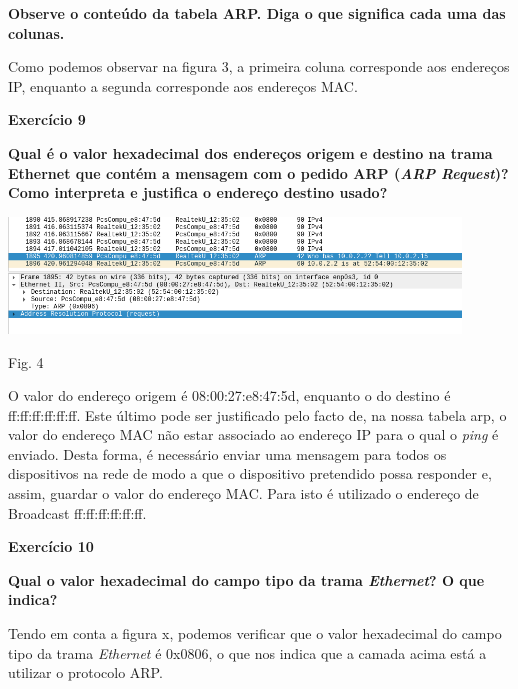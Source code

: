 \documentclass{article}
\begin{document}
\textbf{Observe o conteúdo da tabela ARP. Diga o que significa cada uma das colunas.}\vspace{0.35cm}

\hspace{0.5cm}Como podemos observar na figura 3, a primeira coluna corresponde aos endereços IP, enquanto a segunda corresponde aos endereços MAC.

\vspace{0.5cm}
\clearpage
\textbf{Exercício 9}\vspace{0.5cm}

\textbf{Qual é o valor hexadecimal dos endereços origem e destino na trama Ethernet que contém a mensagem com o pedido ARP (\textit{ARP Request})? Como interpreta e justifica o endereço destino usado?}

\vspace{0.5cm}
\begin{center}
\includegraphics[width = 12cm]{3.png}

\caption{Fig. 4}
\end{center}

O valor do endereço origem é 08:00:27:e8:47:5d, enquanto o do destino é ff:ff:ff:ff:ff:ff. Este último pode ser justificado pelo facto de, na nossa tabela arp, o valor do endereço MAC não estar associado ao endereço IP para o qual o \textit{ping} é enviado. Desta forma, é necessário enviar uma mensagem para todos os dispositivos na rede de modo a que o dispositivo pretendido possa responder e, assim, guardar o valor do endereço MAC. Para isto é utilizado o endereço de Broadcast ff:ff:ff:ff:ff:ff.


\vspace{0.5cm}
\textbf{Exercício 10}\vspace{0.5cm}

\textbf{Qual o valor hexadecimal do campo tipo da trama \textit{Ethernet}? O que indica?}\vspace{0.35cm}

\hspace{0.5cm}Tendo em conta a figura x, podemos verificar que o valor hexadecimal do campo tipo da trama \textit{Ethernet} é 0x0806, o que nos indica que a camada acima está a utilizar o protocolo ARP.
\end{document}
